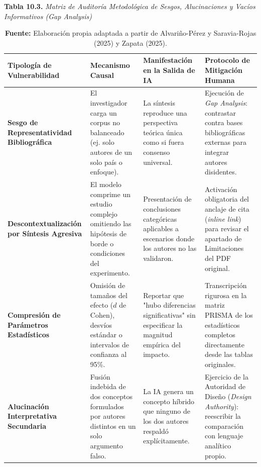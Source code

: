 \vspace{0.4cm}
\begin{table}[htpb!]
\centering
\small
\textbf{Tabla 10.3.} \textit{Matriz de Auditoría Metodológica de Sesgos, Alucinaciones y Vacíos Informativos (Gap Analysis)}\\[0.25cm]
\footnotesize
\renewcommand{\arraystretch}{1.4}
\begin{tabularx}{\textwidth}{>{\raggedright\arraybackslash\bfseries}X >{\raggedright\arraybackslash}X >{\raggedright\arraybackslash}X >{\raggedright\arraybackslash}X}
\toprule
Tipología de Vulnerabilidad & Mecanismo Causal & Manifestación en la Salida de IA & Protocolo de Mitigación Humana \\
\midrule
Sesgo de Re\-pre\-sen\-ta\-ti\-vi\-dad Bibliográfica & El investigador carga un corpus no balanceado (ej. solo autores de un solo país o enfoque). & La síntesis reproduce una perspectiva teórica única como si fuera consenso universal. & Ejecución de \textit{Gap Analysis}: contrastar contra bases bibliográficas externas para integrar autores disidentes. \\
Descontextualización por Síntesis Agresiva & El modelo comprime un estudio complejo omitiendo las hipótesis de borde o condiciones del experimento. & Presentación de conclusiones categóricas aplicables a escenarios donde los autores no las validaron. & Activación obligatoria del anclaje de cita (\textit{inline link}) para revisar el apartado de Limitaciones del PDF original. \\
Compresión de Parámetros Estadísticos & Omisión de tamaños del efecto ($d$ de Cohen), desvíos estándar o intervalos de confianza al 95\%. & Reportar que "hubo diferencias significativas" sin especificar la magnitud empírica del impacto. & Transcripción rigurosa en la matriz PRISMA de los estadísticos completos directamente desde las tablas originales. \\
Alucinación Interpretativa Secundaria & Fusión indebida de dos conceptos formulados por autores distintos en un solo argumento falso. & La IA genera un concepto híbrido que ninguno de los dos autores respaldó explícitamente. & Ejercicio de la Autoridad de Diseño (\textit{Design Authority}): reescribir la comparación con lenguaje analítico propio. \\
\bottomrule
\end{tabularx}
\caption*{\scriptsize \textbf{Fuente:} Elaboración propia adaptada a partir de Alvariño-Pérez y Saravia-Rojas (2025) y Zapata (2025).}
\end{table}

